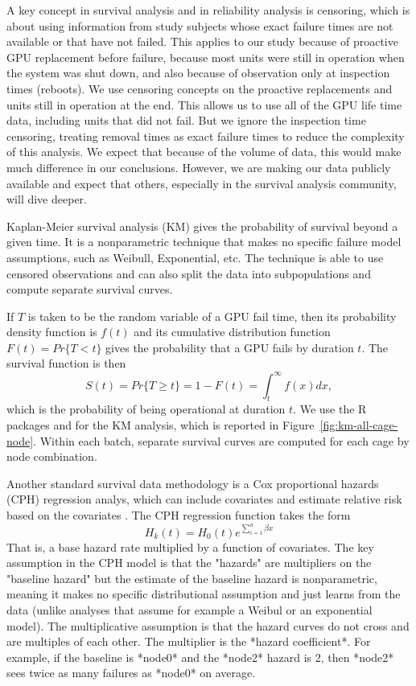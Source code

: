 A key concept in survival analysis and in reliability analysis is
censoring, which is about using information from study subjects whose
exact failure times are not available or that have not failed. This
applies to our study because of proactive GPU replacement before
failure, because most units were still in operation when the system
was shut down, and also because of observation only at inspection
times (reboots). We use censoring concepts on the proactive
replacements and units still in operation at the end. This allows us
to use all of the GPU life time data, including units that did not
fail. But we ignore the inspection time censoring, treating removal
times as exact failure times to reduce the complexity of this
analysis. We expect that because of the volume of data, this would
make much difference in our conclusions. However, we are making our
data publicly available and expect that others, especially in the
survival analysis community, will dive deeper.

Kaplan-Meier survival analysis (KM) gives the probability of survival
beyond a given time. It is a nonparametric technique that makes no
specific failure model assumptions, such as Weibull, Exponential,
etc. The technique is able to use censored observations and can also
split the data into subpopulations and compute separate survival
curves.

If $T$ is taken to be the random variable of a GPU fail time, then its
probability density function is $f(t)$ and its cumulative distribution
function $F(t) = Pr\{T < t\}$ gives the probability that a GPU fails
by duration $t$. The survival function is then 
\begin{displaymath}
  S(t) = Pr\{T \geq t\} = 1 - F(t) = \int_t^\infty f(x)dx,
\end{displaymath}
which is the probability of being operational at duration $t$.  We use
the R packages  and  for the KM analysis,
which is reported in Figure~\ref{fig:km-all-cage-node}. Within each
batch, separate survival curves are computed for each cage by node
combination. 

Another standard survival data methodology is a Cox proportional
hazards (CPH) regression analys, which can include covariates and
estimate relative risk based on the covariates
\cite{Cox1972,Harrell2015}. The CPH regression function takes the form
\begin{displaymath}
  H_k(t) = H_0(t)e^{\sum\limits_{i=1}^n{\beta x}}
\end{displaymath}
That is, a base hazard rate multiplied by a function of
covariates. The key assumption in the CPH model is that the "hazards"
are multipliers on the "baseline hazard" but the estimate of the
baseline hazard is nonparametric, meaning it makes no specific
distributional assumption and just learns from the data (unlike
analyses that assume for example a Weibul or an exponential
model). The multiplicative assumption is that the hazard curves do not
cross and are multiples of each other. The multiplier is the *hazard
coefficient*. For example, if the baseline is *node0* and the *node2*
hazard is 2, then *node2* sees twice as many failures as *node0* on
average. 

